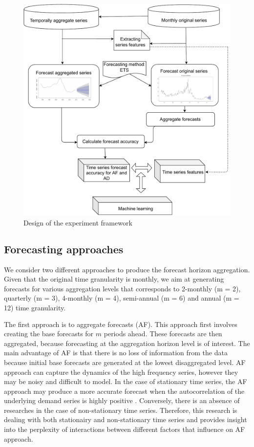 \documentclass[]{elsarticle} %
\begin{document}
\begin{figure}[H]

{\centering \includegraphics[width=0.7\linewidth]{img/300dpi/experiment_design} 

}

\caption{Design of the experiment framework}\label{fig:expdes}
\end{figure}

\hypertarget{forecasting-approaches}{%
\subsection{Forecasting approaches}\label{forecasting-approaches}}

We consider two different approaches to produce the forecast horizon
aggregation. Given that the original time granularity is monthly, we aim
at generating forecasts for various aggregation levels that corresponds
to 2-monthly (m = 2), quarterly (m = 3), 4-monthly (m = 4), semi-annual
(m = 6) and annual (m = 12) time granularity.

The first approach is to aggregate forecasts (AF). This approach first
involves creating the base forecasts for \(m\) periods ahead. These
forecasts are then aggregated, because forecasting at the aggregation
horizon level is of interest. The main advantage of AF is that there is
no loss of information from the data because initial base forecasts are
generated at the lowest disaggregated level. AF approach can capture the
dynamics of the high frequency series, however they may be noisy and
difficult to model. In the case of stationary time series, the AF
approach may produce a more accurate forecast when the autocorrelation
of the underlying demand series is highly positive
\citep{rostami2014note}. Conversely, there is an absence of researches
in the case of non-stationary time series. Therefore, this research is
dealing with both stationairy and non-stationary time series and
provides insight into the perplexity of interactions between different
factors that influence on AF approach.
\end{document}
